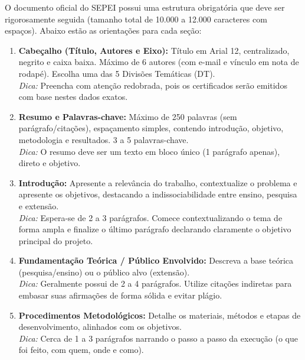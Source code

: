\begin{boxAtividade}

O documento oficial do SEPEI possui uma estrutura obrigatória que deve ser rigorosamente seguida (tamanho total de 10.000 a 12.000 caracteres com espaços). Abaixo estão as orientações para cada seção:

\begin{enumerate}
    \item \textbf{Cabeçalho (Título, Autores e Eixo):} Título em Arial 12, centralizado, negrito e caixa baixa. Máximo de 6 autores (com e-mail e vínculo em nota de rodapé). Escolha uma das 5 Divisões Temáticas (DT).\\
    \textit{Dica:} Preencha com atenção redobrada, pois os certificados serão emitidos com base nestes dados exatos.

    \item \textbf{Resumo e Palavras-chave:} Máximo de 250 palavras (sem parágrafo/citações), espaçamento simples, contendo introdução, objetivo, metodologia e resultados. 3 a 5 palavras-chave.\\
    \textit{Dica:} O resumo deve ser um texto em bloco único (1 parágrafo apenas), direto e objetivo.

    \item \textbf{Introdução:} Apresente a relevância do trabalho, contextualize o problema e apresente os objetivos, destacando a indissociabilidade entre ensino, pesquisa e extensão.\\
    \textit{Dica:} Espera-se de 2 a 3 parágrafos. Comece contextualizando o tema de forma ampla e finalize o último parágrafo declarando claramente o objetivo principal do projeto.

    \item \textbf{Fundamentação Teórica / Público Envolvido:} Descreva a base teórica (pesquisa/ensino) ou o público alvo (extensão).\\
    \textit{Dica:} Geralmente possui de 2 a 4 parágrafos. Utilize citações indiretas para embasar suas afirmações de forma sólida e evitar plágio.

    \item \textbf{Procedimentos Metodológicos:} Detalhe os materiais, métodos e etapas de desenvolvimento, alinhados com os objetivos.\\
    \textit{Dica:} Cerca de 1 a 3 parágrafos narrando o passo a passo da execução (o que foi feito, com quem, onde e como).


\end{enumerate}
\end{boxAtividade}
